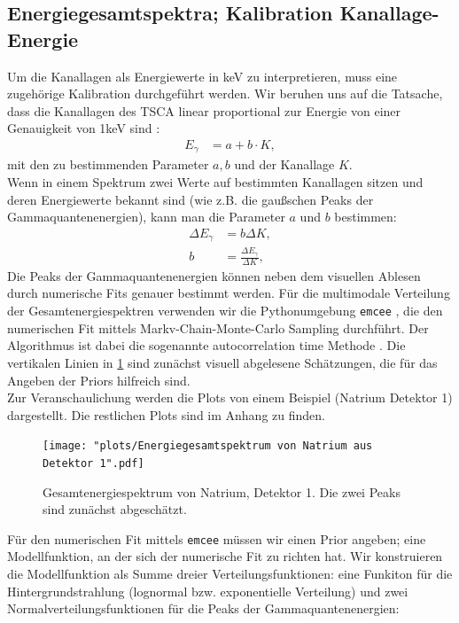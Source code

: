 \documentclass[%
aps,
onecolumn,
11pt,
tightenlines,
nofootinbib,
superscriptaddress,
floatfix,
prd,
]{revtex4-2}
\begin{document}
\subsection{Energiegesamtspektra; Kalibration Kanallage-Energie}
Um die Kanallagen als Energiewerte in keV zu interpretieren, muss eine zugehörige Kalibration durchgeführt werden. Wir beruhen uns auf die Tatsache, dass die Kanallagen des TSCA linear proportional zur Energie von einer Genauigkeit von 1keV sind \cite{manualold}:
\begin{align}
	E_{\gamma} &= a + b\cdot K,
	\label{eq:calibrate}
\end{align}
mit den zu bestimmenden Parameter $a,b$ und der Kanallage $K$. \\
Wenn in einem Spektrum zwei Werte auf bestimmten Kanallagen sitzen und deren Energiewerte bekannt sind (wie z.B. die gaußschen Peaks der Gammaquantenenergien), kann man die Parameter $a$ und $b$ bestimmen:
\begin{align}
	\Delta E_{\gamma} &= b \Delta K , \\
	b &= \frac{\Delta E_{\gamma}}{\Delta K},
\end{align}
Die Peaks der Gammaquantenenergien können neben dem visuellen Ablesen durch numerische Fits genauer bestimmt werden. Für die multimodale Verteilung der Gesamtenergiespektren verwenden wir die Pythonumgebung \texttt{emcee} \cite{Foreman_Mackey_2013}, die den numerischen Fit mittels Markv-Chain-Monte-Carlo Sampling durchführt. Der Algorithmus ist dabei die sogenannte autocorrelation time Methode \cite{Foreman_Mackey_2013}. Die vertikalen Linien in \ref{fig:so1initial} sind zunächst visuell abgelesene Schätzungen, die für das Angeben der Priors hilfreich sind.\\
Zur Veranschaulichung werden die Plots von einem Beispiel (Natrium Detektor 1) dargestellt. Die restlichen Plots sind im Anhang zu finden.
\begin{figure}[H]
		\centering
		\texttt{[image: "plots/Energiegesamtspektrum von Natrium aus Detektor 1".pdf]}
		\caption{Gesamtenergiespektrum von Natrium, Detektor 1.
		Die zwei Peaks sind zunächst abgeschätzt.}
		\label{fig:so1initial}
\end{figure}
Für den numerischen Fit mittels \texttt{emcee} müssen wir einen Prior angeben; eine Modellfunktion, an der sich der numerische Fit zu richten hat. Wir konstruieren die Modellfunktion als Summe dreier Verteilungsfunktionen: eine Funkiton für die Hintergrundstrahlung (lognormal bzw. exponentielle Verteilung) und zwei Normalverteilungsfunktionen für die Peaks der Gammaquantenenergien:
\end{document}
